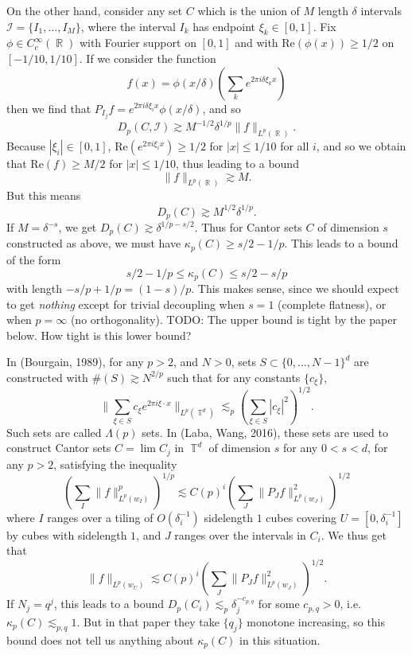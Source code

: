 \documentclass[dvipsnames,letterpaper,12pt]{article}
\numberwithin{equation}{section}
\DeclareMathOperator{\RR}{\mathbb{R}}
\DeclareMathOperator{\TT}{\mathbb{T}}
\numberwithin{theorem}{section}
\begin{document}
On the other hand, consider any set $C$ which is the union of $M$ length $\delta$ intervals $\mathcal{I} = \{ I_1,\dots,I_M \}$, where the interval $I_k$ has endpoint $\xi_k \in [0,1]$. Fix $\phi \in C_c^\infty(\RR)$ with Fourier support on $[0,1]$ and with $\text{Re}(\phi(x)) \geq 1/2$ on $[-1/10,1/10]$. If we consider the function
%
\[ f(x) = \phi(x/\delta) \left( \sum_k e^{2 \pi i \delta \xi_k x} \right) \]
%
then we find that $P_{I_j} f = e^{2 \pi i \delta \xi_i x} \phi(x/\delta)$, and so
%
\[ D_p(C, \mathcal{I}) \gtrsim M^{-1/2} \delta^{1/p} \| f \|_{L^p(\RR)}. \]
%
Because $|\xi_i| \in [0,1]$, $\text{Re}(e^{2 \pi i \xi_i x}) \geq 1/2$ for $|x| \leq 1/10$ for all $i$, and so we obtain that $\text{Re}(f) \geq M/2$ for $|x| \leq 1/10$, thus leading to a bound
%
\[ \| f \|_{L^p(\RR)} \gtrsim M. \]
%
But this means
%
\[ D_p(C) \gtrsim M^{1/2} \delta^{1/p}. \]
%
If $M = \delta^{-s}$, we get $D_p(C) \gtrsim \delta^{1/p - s/2}$. Thus for Cantor sets $C$ of dimension $s$ constructed as above, we must have $\kappa_p(C) \geq s/2 - 1/p$. This leads to a bound of the form
%
\[ s/2 - 1/p \leq \kappa_p(C) \leq s/2 - s/p \]
%
with length $-s/p + 1/p = (1 - s) / p$. This makes sense, since we should expect to get \emph{nothing} except for trivial decoupling when $s = 1$ (complete flatness), or when $p = \infty$ (no orthogonality). TODO: The upper bound is tight by the paper below. How tight is this lower bound?

In (Bourgain, 1989), for any $p > 2$, and $N > 0$, sets $S \subset \{ 0, \dots, N-1 \}^d$ are constructed with $\#(S) \gtrsim N^{2/p}$ such that for any constants $\{ c_\xi \}$,
%
\[ \| \sum_{\xi \in S} c_\xi e^{2 \pi i \xi \cdot x} \|_{L^p(\TT^d)} \lesssim_p \left( \sum_{\xi \in S} |c_\xi|^2 \right)^{1/2}. \]
%
Such sets are called $\Lambda(p)$ sets. In (Laba, Wang, 2016), these sets are used to construct Cantor sets $C = \lim C_j$ in $\TT^d$ of dimension $s$ for any $0 < s < d$, for any $p > 2$, satisfying the inequality
%
\[ \left( \sum_I \| f \|_{L^p(w_I)}^p \right)^{1/p} \lesssim C(p)^i \left( \sum_J \| P_J f \|_{L^p(w_J)}^2 \right)^{1/2} \]
%
where $I$ ranges over a tiling of $O(\delta_i^{-1})$ sidelength $1$ cubes covering $U = [0,\delta_i^{-1}]$ by cubes with sidelength $1$, and $J$ ranges over the intervals in $C_i$. We thus get that
%
\[ \| f \|_{L^p(w_U)} \lesssim C(p)^i \left( \sum_J \| P_J f \|_{L^p(w_J)}^2 \right)^{1/2}. \]
%
If $N_j = q^j$, this leads to a bound $D_p(C_i) \lesssim_p \delta_j^{-c_{p,q}}$ for some $c_{p,q} > 0$, i.e. $\kappa_p(C) \lesssim_{p,q} 1$. But in that paper they take $\{ q_j \}$ monotone increasing, so this bound does not tell us anything about $\kappa_p(C)$ in this situation.
\end{document}
